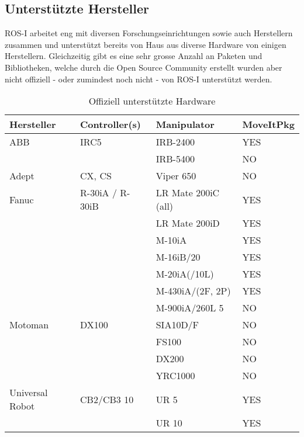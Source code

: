 \subsection{Unterstützte Hersteller}
ROS-I arbeitet eng mit diversen Forschungseinrichtungen sowie auch Herstellern zusammen und unterstützt bereits von Haus aus diverse Hardware von einigen Herstellern. Gleichzeitig gibt es eine sehr grosse Anzahl an Paketen und Bibliotheken, welche durch die Open Source Community erstellt wurden aber nicht offiziell - oder zumindest noch nicht - von ROS-I unterstützt werden.
\begin{table}[H]
	\centering
	\begin{tabular}{llll}
		\textbf{Hersteller} & \textbf{Controller(s)} & \textbf{Manipulator} & \textbf{MoveItPkg} \\ \hline
		ABB                 & IRC5                   & IRB-2400             & YES                \\
		                    &                        & IRB-5400             & NO                 \\ \hline
		Adept               & CX, CS                 & Viper 650            & NO                 \\ \hline
		Fanuc               & R-30iA / R-30iB        & LR Mate 200iC (all)  & YES                \\
		                    &                        & LR Mate 200iD        & YES                \\
		                    &                        & M-10iA               & YES                \\
		                    &                        & M-16iB/20            & YES                \\
		                    &                        & M-20iA(/10L)         & YES                \\
		                    &                        & M-430iA/(2F, 2P)     & YES                \\
		                    &                        & M-900iA/260L 5       & NO                 \\ \hline
		Motoman             & DX100                  & SIA10D/F             & NO                 \\
		                    &                        & FS100                & NO                 \\
		                    &                        & DX200                & NO                 \\
		                    &                        & YRC1000              & NO                 \\ \hline
		Universal Robot     & CB2/CB3 10             & UR 5                 & YES                \\
		                    &                        & UR 10                & YES                \\ \hline
	\end{tabular}
	\caption[Offiziell unterstützte Hardware]{Offiziell unterstützte Hardware\cite{HardwareSup:online}}
	\label{tab:hersteller}
\end{table}

